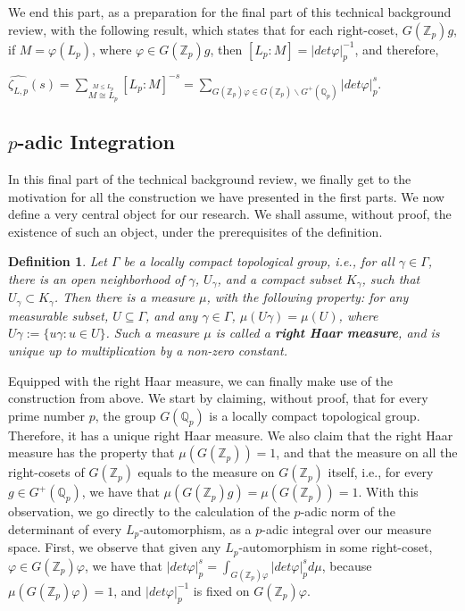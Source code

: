 \documentclass[12pt]{article}
\newtheorem{definition}[theorem]{Definition}
\begin{document}
We end this part, as a preparation for the final part of this technical background review, with the following result, which states that for each right-coset, $G(\mathbb{Z}_p)g$, if $M=\varphi(L_p)$, where $\varphi\in G(\mathbb{Z}_p)g$, then $[L_p:M]=|det\varphi|_p^{-1}$, and therefore,\par $\hat{\zeta_{L,p}}(s)=\underset{\overset{\scriptscriptstyle M\leq L_p}{\scriptscriptstyle M\cong L_p}}{\sum}[L_p:M]^{-s}=\underset{\scriptscriptstyle G(\mathbb{Z}_p)\varphi\in G(\mathbb{Z}_p)\backslash G^+(\mathbb{Q}_p)}{\sum}|det\varphi|_p^s$.
\subsection{$p$-adic Integration}
In this final part of the technical background review, we finally get to the motivation for all the construction we have presented in the first parts. We now define a very central object for our research. We shall assume, without proof, the existence of such an object, under the prerequisites of the definition.
\begin{definition}
\label{def.right.haar.measure}
Let $\Gamma$ be a locally compact topological group, i.e., for all $\gamma\in\Gamma$, there is an open neighborhood of $\gamma$, $U_{\gamma}$, and a compact subset $K_{\gamma}$, such that $U_{\gamma}\subset K_{\gamma}$. Then there is a measure $\mu$, with the following property: for any measurable subset, $U\subseteq\Gamma$, and any $\gamma\in\Gamma$, $\mu(U\gamma)=\mu(U)$, where $U\gamma:=\{u\gamma : u\in U\}$. Such a measure $\mu$ is called a \textbf{right Haar measure}, and is unique up to multiplication by a non-zero constant.
\end{definition}
Equipped with the right Haar measure, we can finally make use of the construction from above. We start by claiming, without proof, that for every prime number $p$, the group $G(\mathbb{Q}_p)$ is a locally compact topological group. Therefore, it has a unique right Haar measure. We also claim that the right Haar measure has the property that $\mu(G(\mathbb{Z}_p))=1$, and that the measure on all the right-cosets of $G(\mathbb{Z}_p)$ equals to the measure on $G(\mathbb{Z}_p)$ itself, i.e., for every $g\in G^{+}(\mathbb{Q}_p)$, we have that $\mu(G(\mathbb{Z}_p)g)=\mu(G(\mathbb{Z}_p))=1$.
With this observation, we go directly to the calculation of the $p$-adic norm of the determinant of every $L_p$-automorphism, as a $p$-adic integral over our measure space.
First, we observe that given any $L_p$-automorphism in some right-coset, $\varphi\in G(\mathbb{Z}_p)\varphi$, we have that $|det\varphi|_p^s=\displaystyle\int_{G(\mathbb{Z}_p)\varphi}|det\varphi|_p^sd\mu$, because $\mu(G(\mathbb{Z}_p)\varphi)=1$, and $|det\varphi|_p^{-1}$ is fixed on $G(\mathbb{Z}_p)\varphi$.\par
\end{document}
